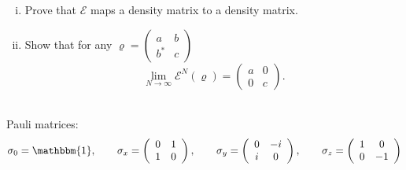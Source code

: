 \documentclass[a4paper,10pt]{article}
\begin{document}
\begin{enumerate}[i)]
\item Prove that $\mathcal{E}$ maps a density matrix to a density matrix.
\item Show that for any
$\varrho = \left(\begin{array}{cc} a   & b \\ b^* & c \end{array}\right)$
\begin{equation}
\lim_{N\to\infty} \mathcal{E}^N (\varrho) = \left(\begin{array}{cc}
a & 0 \\
0 & c
\end{array}\right).
\end{equation}
\end{enumerate}


\vfill
\hrulefill \\
Pauli matrices:
\begin{equation}
\sigma_0 = \mathbbm{1}, \qquad
\sigma_x = \left(\begin{array}{cc} 0 & 1 \\ 1 & 0 \end{array}\right), \qquad
\sigma_y = \left(\begin{array}{cc} 0 & -i \\ i & 0 \end{array}\right), \qquad
\sigma_z = \left(\begin{array}{cc} 1 & 0 \\ 0 & -1 \end{array}\right)
\end{equation}
\end{document}
